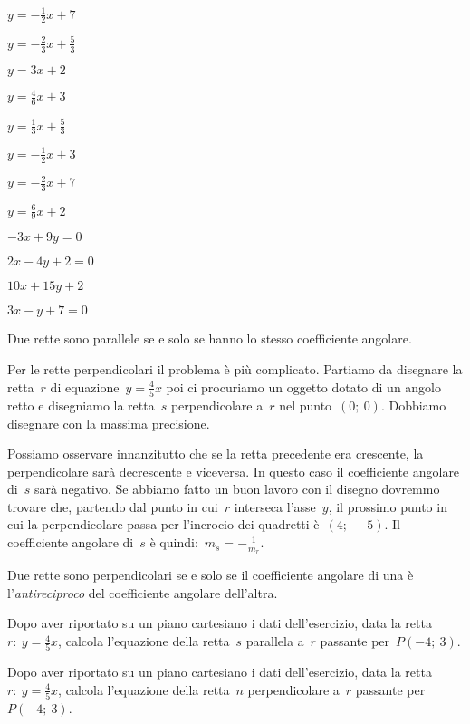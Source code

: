 \begin{multicols}{4}
 \TabPositions{0.6cm}
 \begin{enumeratea}
 \item $y=-\frac{1}{2}x + 7$
 \item $y=-\frac{2}{3}x + \frac{5}{3}$
 \item $y={3}x + 2$
 \item $y=\frac{4}{6}x + 3$
 \item $y=\frac{1}{3}x + \frac{5}{3}$
 \item $y=-\frac{1}{2}x + 3$
 \item $y=-\frac{2}{3}x + 7$
 \item $y=\frac{6}{9}x + 2$
 \item $-3x + 9y = 0$
 \item $2x - 4y + 2 = 0$
 \item $10x + 15y + 2$
 \item $3x -y + 7 = 0$
 \end{enumeratea}
\end{multicols}

\begin{definizione}
Due rette sono parallele se e solo se hanno lo stesso coefficiente angolare.
\end{definizione}

Per le rette perpendicolari il problema è più complicato. Partiamo da 
disegnare la retta~$r$ di equazione~$y = \frac{4}{5} x$ poi ci procuriamo 
un oggetto dotato di un angolo retto e disegniamo la retta~$s$ perpendicolare 
a~$r$ nel punto~$(0;~0)$. Dobbiamo disegnare con la massima precisione. 

Possiamo osservare innanzitutto che se la retta precedente era crescente, la 
perpendicolare sarà decrescente e viceversa. In questo caso il coefficiente 
angolare di~$s$ sarà negativo. Se abbiamo fatto un buon lavoro con il disegno 
dovremmo trovare che, partendo dal punto in cui~$r$ interseca l'asse~$y$, il 
prossimo punto in cui la perpendicolare passa per l'incrocio dei quadretti 
è~$(4;~-5)$. Il coefficiente angolare di~$s$ è quindi:~$m_s = - \frac{1}{m_r}$.

\begin{definizione}
Due rette sono perpendicolari se e solo se il coefficiente angolare di 
una è l'\emph{antireciproco} del coefficiente angolare dell'altra.
\end{definizione}

\begin{exrig}
 \begin{esempio}
  Dopo aver riportato su un piano cartesiano i dati dell'esercizio,
  data la retta~$r:~y = \frac{4}{5} x$, calcola l'equazione della retta~$s$  
  parallela a~$r$ passante per~$P(-4;~3)$.
 \end{esempio}
 \begin{esempio}
  Dopo aver riportato su un piano cartesiano i dati dell'esercizio,
  data la retta~$r:~y = \frac{4}{5} x$, calcola l'equazione della retta~$n$  
  perpendicolare a~$r$ passante per~$P(-4;~3)$.
 \end{esempio}
\end{exrig}

